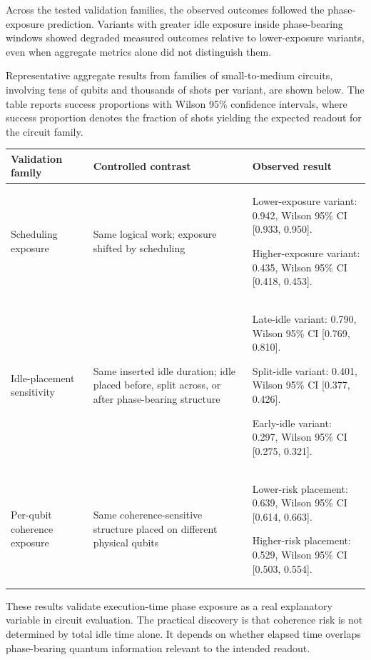 \documentclass[11pt]{article}
\begin{document}
Across the tested validation families, the observed outcomes followed the phase-exposure prediction. Variants with greater idle exposure inside phase-bearing windows showed degraded measured outcomes relative to lower-exposure variants, even when aggregate metrics alone did not distinguish them.

Representative aggregate results from families of small-to-medium circuits, involving tens of qubits and thousands of shots per variant, are shown below. The table reports success proportions with Wilson 95\% confidence intervals, where success proportion denotes the fraction of shots yielding the expected readout for the circuit family.

\begin{center}
\renewcommand{\arraystretch}{1.25}
\begin{tabularx}{\textwidth}{>{\raggedright\arraybackslash}p{}
>{\raggedright\arraybackslash}p{}
>{\raggedright\arraybackslash}X}
\toprule
Validation family & Controlled contrast & Observed result \\
\midrule
Scheduling exposure &
Same logical work; exposure shifted by scheduling &
Lower-exposure variant: 0.942, Wilson 95\% CI [0.933, 0.950].

Higher-exposure variant: 0.435, Wilson 95\% CI [0.418, 0.453]. \\
\midrule
Idle-placement sensitivity &
Same inserted idle duration; idle placed before, split across, or after phase-bearing structure &
Late-idle variant: 0.790, Wilson 95\% CI [0.769, 0.810].

Split-idle variant: 0.401, Wilson 95\% CI [0.377, 0.426].

Early-idle variant: 0.297, Wilson 95\% CI [0.275, 0.321]. \\
\midrule
Per-qubit coherence exposure &
Same coherence-sensitive structure placed on different physical qubits &
Lower-risk placement: 0.639, Wilson 95\% CI [0.614, 0.663].

Higher-risk placement: 0.529, Wilson 95\% CI [0.503, 0.554]. \\
\bottomrule
\end{tabularx}
\end{center}

These results validate execution-time phase exposure as a real explanatory variable in circuit evaluation. The practical discovery is that coherence risk is not determined by total idle time alone. It depends on whether elapsed time overlaps phase-bearing quantum information relevant to the intended readout.
\end{document}
